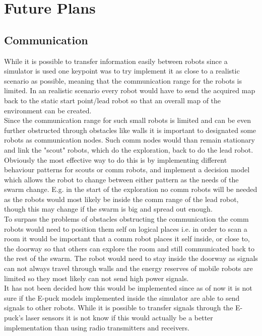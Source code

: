 \chapter{Future Plans}
\label{Future_plans}
\section{Communication}
While it is possible to transfer information easily between robots since a simulator is used one keypoint was to try implement it as close to a realistic scenario as possible, meaning that the communication range for the robots is limited. In an realistic scenario every robot would have to send the acquired map back to the static start point/lead robot so that an overall map of the environment can be created. \\
Since the communication range for such small robots is limited and can be even further obstructed through obstacles like walls it is important to designated some robots as communication nodes. Such comm nodes would than remain stationary and link the "scout" robots, which do the exploration, back to do the lead robot. \\
Obviously the most effective way to do this is by implementing different behaviour patterns for scouts or comm robots, and implement a decision model which allows the robot to change between either pattern as the needs of the swarm change. E.g. in the start of the exploration no comm robots will be needed as the robots would most likely be inside the comm range of the lead robot, though this may change if the swarm is big and spread out enough. \\[3ex]

To surpass the problems of obstacles obstructing the communication the comm robots would need to position them self on logical places i.e. in order to scan a room it would be important that a comm robot places it self inside, or close to, the doorway so that others can explore the room and still communicated back to the rest of the swarm. The robot would need to stay inside the doorway as signals can not always travel through walls and the energy reserves of mobile robots are limited so they most likely can not send high power signals. \\
It has not been decided how this would be implemented since as of now it is not sure if the E-puck models implemented inside the simulator are able to send signals to other robots. While it is possible  to transfer signals through the E-puck's laser sensors it is not know if this would actually be a better implementation than using radio transmitters and receivers.\\[3ex]


